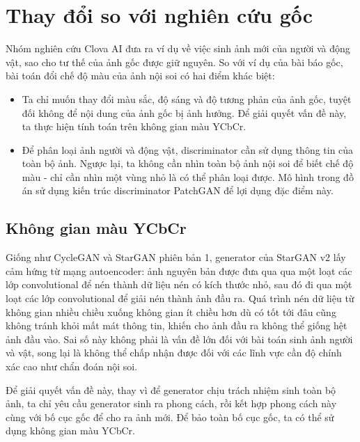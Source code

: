 \documentclass[12pt]{extreport}
\begin{document}
\section{Thay đổi so với nghiên cứu gốc}

Nhóm nghiên cứu Clova AI đưa ra ví dụ về việc sinh ảnh mới của người và động vật, sao cho tư thế của ảnh gốc được giữ nguyên. So với ví dụ của bài báo gốc, bài toán đổi chế độ màu của ảnh nội soi có hai điểm khác biệt:
\begin{itemize}
    \item Ta chỉ muốn thay đổi màu sắc, độ sáng và độ tương phản của ảnh gốc, tuyệt đối không để nội dung của ảnh gốc bị ảnh hưởng. Để giải quyết vấn đề này, ta thực hiện tính toán trên không gian màu YCbCr.
    \item Để phân loại ảnh người và động vật, discriminator cần sử dụng thông tin của toàn bộ ảnh. Ngược lại, ta không cần nhìn toàn bộ ảnh nội soi để biết chế độ màu - chỉ cần nhìn một vùng nhỏ là có thể phân loại được. Mô hình trong đồ án sử dụng kiến trúc discriminator PatchGAN để lợi dụng đặc điểm này.
\end{itemize}

\subsection{Không gian màu YCbCr}
\label{ycbcr-colorspace}

Giống như CycleGAN và StarGAN phiên bản 1, generator của StarGAN v2 lấy cảm hứng từ mạng autoencoder: ảnh nguyên bản được đưa qua qua một loạt các lớp convolutional để nén thành dữ liệu nén có kích thước nhỏ, sau đó đi qua một loạt các lớp convolutional để giải nén thành ảnh đầu ra. Quá trình nén dữ liệu từ không gian nhiều chiều xuống không gian ít chiều hơn dù có tốt tới đâu cũng không tránh khỏi mất mát thông tin, khiến cho ảnh đầu ra không thể giống hệt ảnh đầu vào. Sai số này không phải là vấn đề lớn đối với bài toán sinh ảnh người và vật, song lại là không thể chấp nhận được đối với các lĩnh vực cần độ chính xác cao như chẩn đoán nội soi.

Để giải quyết vấn đề này, thay vì để generator chịu trách nhiệm sinh toàn bộ ảnh, ta chỉ yêu cầu generator sinh ra phong cách, rồi kết hợp phong cách này cùng với bố cục gốc để cho ra ảnh mới. Để bảo toàn bố cục gốc, ta có thể sử dụng không gian màu YCbCr.
\end{document}
